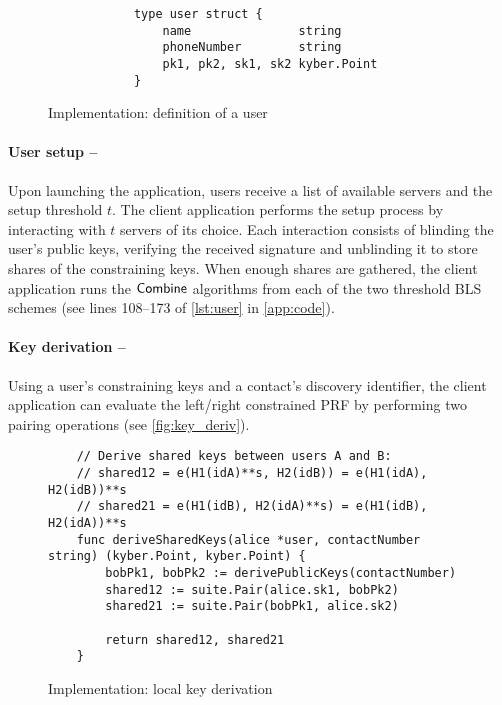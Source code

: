 	\begin{figure}[H]
	\begin{center}
		\begin{lstlisting}
			type user struct {
				name               string
				phoneNumber        string
				pk1, pk2, sk1, sk2 kyber.Point
			}
		\end{lstlisting}
	\caption{Implementation: definition of a user}
	\label{fig:user_def}
	\end{center}
\end{figure}


	\paragraph{User setup --} Upon launching the application, users receive a list of available servers and the setup threshold $t$. The client application performs the setup process by interacting with $t$ servers of its choice. Each interaction consists of blinding the user's public keys, verifying the received signature and unblinding it to store shares of the constraining keys. When enough shares are gathered, the client application runs the $\mathsf{Combine}$ algorithms from each of the two threshold BLS schemes (see lines 108--173 of \autoref{lst:user} in \autoref{app:code}).



	\paragraph{Key derivation --} Using a user's constraining keys and a contact's discovery identifier, the client application can evaluate the left/right constrained PRF by performing two pairing operations (see \autoref{fig:key_deriv}).
	
	\begin{figure}[H]
	\begin{center}
		\begin{lstlisting}
	// Derive shared keys between users A and B:
	// shared12 = e(H1(idA)**s, H2(idB)) = e(H1(idA), H2(idB))**s
	// shared21 = e(H1(idB), H2(idA)**s) = e(H1(idB), H2(idA))**s
	func deriveSharedKeys(alice *user, contactNumber string) (kyber.Point, kyber.Point) {
		bobPk1, bobPk2 := derivePublicKeys(contactNumber)
		shared12 := suite.Pair(alice.sk1, bobPk2)
		shared21 := suite.Pair(bobPk1, alice.sk2)
	
		return shared12, shared21
	}
		\end{lstlisting}
	\caption{Implementation: local key derivation}
	\label{fig:key_deriv}
	\end{center}
\end{figure}



